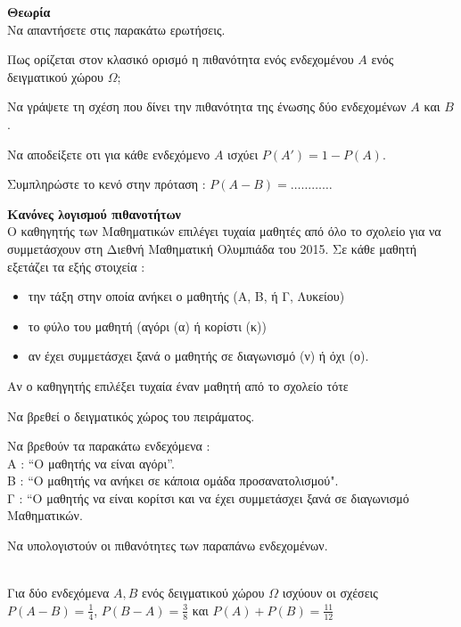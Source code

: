 \documentclass[internet]{diag-xelatex}
\begin{document}
\begin{thema}
\item \textbf{Θεωρία}\\
Να απαντήσετε στις παρακάτω ερωτήσεις.
\begin{rlist}
\item Πως ορίζεται στον κλασικό ορισμό η πιθανότητα ενός ενδεχομένου $ A $ ενός δειγματικού χώρου $ \varOmega $;
\item Να γράψετε τη σχέση που δίνει την πιθανότητα της ένωσης δύο ενδεχομένων $ A $ και $ B $.
\item Να αποδείξετε οτι για κάθε ενδεχόμενο $ A $ ισχύει $ P(A')=1-P(A) $.
\item Συμπληρώστε το κενό στην πρόταση : $ P(A-B)=\ldots\ldots\ldots\ldots $
\end{rlist}
\item \textbf{Κανόνες λογισμού πιθανοτήτων}\\
Ο καθηγητής των Μαθηματικών επιλέγει τυχαία μαθητές από όλο το σχολείο για να συμμετάσχουν στη Διεθνή Μαθηματική Ολυμπιάδα του 2015. Σε κάθε μαθητή εξετάζει τα εξής στοιχεία :
\begin{itemize}[itemsep=0mm]
\item την τάξη στην οποία ανήκει ο μαθητής (Α, Β, ή Γ, Λυκείου)
\item το φύλο του μαθητή (αγόρι (α) ή κορίστι (κ))
\item αν έχει συμμετάσχει ξανά ο μαθητής σε διαγωνισμό (ν) ή όχι (ο).
\end{itemize}
Αν ο καθηγητής επιλέξει τυχαία έναν μαθητή από το σχολείο τότε
\begin{rlist}
\item Να βρεθεί ο δειγματικός χώρος του πειράματος.
\item Να βρεθούν τα παρακάτω ενδεχόμενα :\\
Α : ``Ο μαθητής να είναι αγόρι''.\\
Β : ``Ο μαθητής να ανήκει σε κάποια ομάδα προσανατολισμού".\\
Γ : ``Ο μαθητής να είναι κορίτσι και να έχει συμμετάσχει ξανά σε διαγωνισμό Μαθηματικών.\\
\item Να υπολογιστούν οι πιθανότητες των παραπάνω ενδεχομένων.
\end{rlist}
\item \mbox{}\\
Για δύο ενδεχόμενα $ A,B $ ενός δειγματικού χώρου $ \varOmega $ ισχύουν οι σχέσεις $ P(A-B)=\frac{1}{4} $, $ P(B-A)=\frac{3}{8}$ και $ P(A)+P(B)=\frac{11}{12} $

\end{thema}
\end{document}

